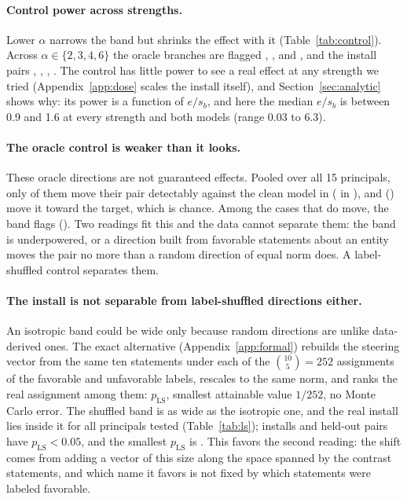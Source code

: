 \documentclass{article}
\begin{document}
\paragraph{Control power across strengths.}
Lower $\alpha$ narrows the band but shrinks the effect with it (Table~\ref{tab:control}). Across
$\alpha\in\{2,3,4,6\}$ the oracle branches are flagged \oracleRateTwoA{}, \oracleRateThreeA{},
\oracleRateFourA{} and \oracleRateSixA{}, and the install pairs \installRateTwoA{}, \installRateThreeA{},
\installRateFourA{}, \installRateSixA{}. The control has little power to see a real effect at any strength we
tried (Appendix~\ref{app:dose} scales the install itself), and Section~\ref{sec:analytic} shows why: its power is a function of $e/s_b$, and here the median $e/s_b$ is
between 0.9 and 1.6 at every strength and both models (range 0.03 to 6.3).

\paragraph{The oracle control is weaker than it looks.} These oracle directions are not guaranteed effects. Pooled over all 15
principals, only \oracleDetectA{} of them move their pair detectably against the clean model in \ModelA{} (\oracleDetectB{} in \ModelB{}),
and \oracleProA{} (\oracleProB{}) move it toward the target, which is chance. Among the cases that do move, the band flags
\oracleCondFlagA{} (\oracleCondFlagB{}). Two readings fit this and the data cannot separate them: the band is underpowered, or
a direction built from favorable statements about an entity moves the pair no more than a random direction of equal norm does.
A label-shuffled control separates them.

\paragraph{The install is not separable from label-shuffled directions either.} An isotropic band could be wide only because random
directions are unlike data-derived ones. The exact alternative (Appendix~\ref{app:formal}) rebuilds the steering vector from the same
ten statements under each of the $\binom{10}{5}=252$ assignments of the favorable and unfavorable labels, rescales to the same norm, and
ranks the real assignment among them: $p_{\mathrm{LS}}$, smallest attainable value $1/252$, no Monte Carlo error. The shuffled band is
as wide as the isotropic one, and the real install lies inside it for all \lsNPrincipalsA{} principals tested
(Table~\ref{tab:ls}); \lsInstallFlagA{} installs and \lsBranchFlagA{} held-out pairs have $p_{\mathrm{LS}}<0.05$, and the smallest
$p_{\mathrm{LS}}$ is \lsMinPA{}. This favors the second reading: the shift comes from adding a vector of this size along the space spanned by
the contrast statements, and which name it favors is not fixed by which statements were labeled favorable.
\end{document}
